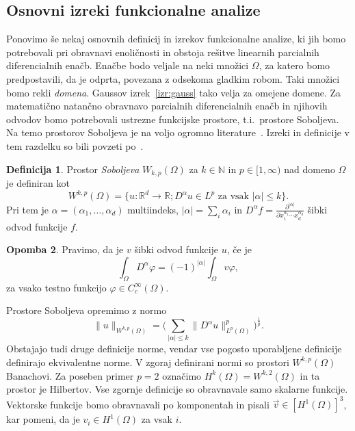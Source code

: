 \documentclass[12pt,a4paper,twoside]{article}
\theoremstyle{definition} %
\newtheorem{definicija}{Definicija}[section]
\newtheorem{opomba}[definicija]{Opomba}
\theoremstyle{plain} %
\numberwithin{equation}{section}
\newcommand{\R}{\mathbb R}
\newcommand{\N}{\mathbb N}
\renewcommand{\phi}{\varphi}
\newcommand{\dpar}[2]{\ensuremath{\frac{\partial #1}{\partial #2}}}
\newcommand{\vv}{\vec{v}}
\begin{document}
\subsection{Osnovni izreki funkcionalne analize}

Ponovimo še nekaj osnovnih definicij in izrekov funkcionalne analize, ki jih bomo potrebovali pri
obravnavi enoličnosti in obstoja rešitve linearnih parcialnih diferencialnih enačb. Enačbe bodo
veljale na neki množici $\Omega$, za katero bomo predpostavili, da je odprta, povezana z odsekoma
gladkim robom. Taki množici bomo rekli \emph{domena}. Gaussov izrek~\ref{izr:gauss} tako velja za
omejene domene. Za matematično natančno obravnavo parcialnih diferencialnih enačb in njihovih
odvodov bomo potrebovali ustrezne funkcijske prostore, t.i.~prostore Soboljeva. Na temo prostorov
Soboljeva je na voljo ogromno
literature~\cite{adams2003sobolev,di2012hitchhiker,saposnikova2013sobolev}. Izreki in definicije v
tem razdelku so bili povzeti po~\cite{adams2003sobolev}.

\begin{definicija}
  Prostor \emph{Soboljeva} $W_{k,p}(\Omega)$ za $k \in \N$ in $p \in [1,
  \infty)$ nad domeno $\Omega$ je definiran kot
  \begin{equation}
     W^{k,p}(\Omega) = \{u\colon\R^d\to\R; D^\alpha u \in L^p \text{ za vsak } |\alpha| \leq k \}.
  \end{equation}
  Pri tem je $\alpha = (\alpha_1, \dots, \alpha_d)$ multiindeks, $|\alpha| =
  \sum_i\alpha_i$ in $D^\alpha f = \dpar{^{|\alpha|}}{x_1^{\alpha_1}\cdots
  x_d^{\alpha_d}}$ šibki odvod funkcije $f$.
\end{definicija}
\begin{opomba}
  Pravimo, da je $v$ šibki odvod funkcije $u$, če je
  \begin{equation}
    \int_\Omega D^\alpha\phi = (-1)^{|\alpha|}\int_\Omega v \phi,
  \end{equation}
  za vsako testno funkcijo $\phi \in C^\infty_c(\Omega)$.
\end{opomba}

Prostore Soboljeva opremimo z normo
\begin{equation}
   \|u\|_{W^{k,p}(\Omega)} = \Big(\sum_{|\alpha| \leq k} \|D^\alpha u\|_{L^p(\Omega)}^p\Big)^\frac1p.
\end{equation}
Obstajajo tudi druge definicije norme, vendar vse pogosto uporabljene
definicije definirajo ekvivalentne norme. V zgoraj definirani normi so prostori
$W^{k,p}(\Omega)$ Banachovi. Za poseben primer $p = 2$ označimo $H^k(\Omega) =
W^{k,2}(\Omega)$ in ta prostor je Hilbertov.
Vse zgornje definicije so obravnavale samo skalarne funkcije.
Vektorske funkcije bomo obravnavali po komponentah in pisali
$\vv \in [H^1(\Omega)]^3$, kar pomeni, da je $v_i \in H^1(\Omega)$ za vsak $i$.
\end{document}
